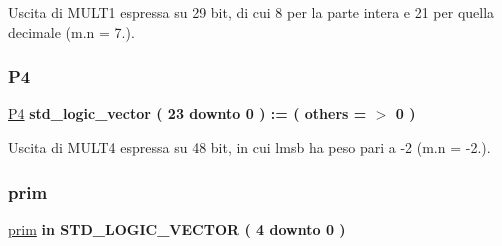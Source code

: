Uscita di M\+U\+L\+T1 espressa su 29 bit, di cui 8 per la parte intera e 21 per quella decimale (m.\+n = 7.). \mbox{\label{group___linear_regression_ga4fb44e5594257c32300225a509c90dd7}} 
\subsubsection{\texorpdfstring{P4}{P4}}
{\footnotesize\ttfamily \hyperlink{group___linear_regression_ga4fb44e5594257c32300225a509c90dd7}{P4} {\bfseries \textcolor{vhdlchar}{std\+\_\+logic\+\_\+vector}\textcolor{vhdlchar}{ }\textcolor{vhdlchar}{(}\textcolor{vhdlchar}{ }\textcolor{vhdlchar}{ } \textcolor{vhdldigit}{23} \textcolor{vhdlchar}{ }\textcolor{vhdlchar}{downto}\textcolor{vhdlchar}{ }\textcolor{vhdlchar}{ } \textcolor{vhdldigit}{0} \textcolor{vhdlchar}{ }\textcolor{vhdlchar}{)}\textcolor{vhdlchar}{ }\textcolor{vhdlchar}{ }\textcolor{vhdlchar}{ }\textcolor{vhdlchar}{\+:}\textcolor{vhdlchar}{=}\textcolor{vhdlchar}{ }\textcolor{vhdlchar}{(}\textcolor{vhdlchar}{ }\textcolor{vhdlchar}{ }\textcolor{vhdlchar}{others}\textcolor{vhdlchar}{ }\textcolor{vhdlchar}{ }\textcolor{vhdlchar}{=}\textcolor{vhdlchar}{ }\textcolor{vhdlchar}{$>$}\textcolor{vhdlchar}{ }\textcolor{vhdlchar}{\textquotesingle{}}\textcolor{vhdlchar}{ } \textcolor{vhdldigit}{0} \textcolor{vhdlchar}{ }\textcolor{vhdlchar}{\textquotesingle{}}\textcolor{vhdlchar}{ }\textcolor{vhdlchar}{)}\textcolor{vhdlchar}{ }} \hspace{0.3cm}{\ttfamily [Signal]}}

Uscita di M\+U\+L\+T4 espressa su 48 bit, in cui l\textquotesingle{}msb ha peso pari a -\/2 (m.\+n = -\/2.). \mbox{\label{group___linear_regression_ga6b9afe9c48db695b7336519281c099a8}} 
\subsubsection{\texorpdfstring{prim}{prim}}
{\footnotesize\ttfamily \hyperlink{group___linear_regression_ga6b9afe9c48db695b7336519281c099a8}{prim} {\bfseries \textcolor{vhdlchar}{in}\textcolor{vhdlchar}{ }} {\bfseries \textcolor{vhdlchar}{S\+T\+D\+\_\+\+L\+O\+G\+I\+C\+\_\+\+V\+E\+C\+T\+OR}\textcolor{vhdlchar}{ }\textcolor{vhdlchar}{(}\textcolor{vhdlchar}{ }\textcolor{vhdlchar}{ } \textcolor{vhdldigit}{4} \textcolor{vhdlchar}{ }\textcolor{vhdlchar}{downto}\textcolor{vhdlchar}{ }\textcolor{vhdlchar}{ } \textcolor{vhdldigit}{0} \textcolor{vhdlchar}{ }\textcolor{vhdlchar}{)}\textcolor{vhdlchar}{ }} \hspace{0.3cm}{\ttfamily [Port]}}



